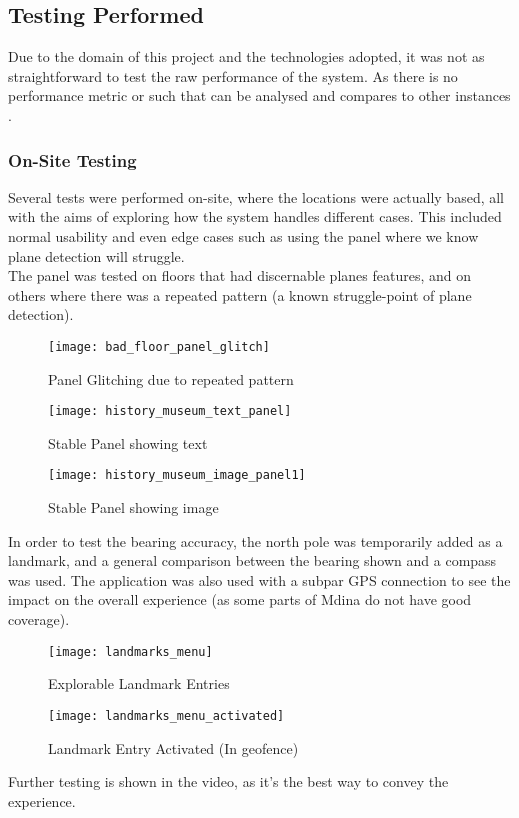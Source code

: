 \subsection{Testing Performed}
Due to the domain of this project and the technologies adopted, it was not as straightforward to 
test the raw performance of the system. As there is no performance metric or such that can be 
analysed and compares to other instances \cite{Samini2017}. 
\subsubsection{On-Site Testing}
Several tests were performed on-site, where the locations were actually based, all with the aims of exploring how the system handles different cases. 
This included normal usability and even edge cases such as using the panel where we know plane detection will struggle.
\\
The panel was tested on floors that had discernable planes features, and on others where there was a repeated pattern (a known struggle-point of plane detection).\\
\begin{figure}[!htb]
        \texttt{[image: bad\_floor\_panel\_glitch]}
            \caption{Panel Glitching due to repeated pattern}
            \label{fig:bad_panel}
    \endminipage\hfill
        \texttt{[image: history\_museum\_text\_panel]}
        \caption{Stable Panel showing text}
        \label{fig:panel_text}
    \endminipage\hfill
        \texttt{[image: history\_museum\_image\_panel1]}
        \caption{Stable Panel showing image}
        \label{fig:panel_img}
    \endminipage
    \end{figure}

\noindent
In order to test the bearing accuracy, the north pole was temporarily added as a landmark, and a general comparison between the bearing shown and a compass was used.
The application was also used with a subpar GPS connection to see the impact on the overall experience (as some parts of Mdina do not have good coverage).

\begin{figure}[!htb]
        \texttt{[image: landmarks\_menu]}
            \caption{Explorable Landmark Entries}
            \label{fig:explor_lands}
    \endminipage\hfill
        \texttt{[image: landmarks\_menu\_activated]}
        \caption{Landmark Entry Activated (In geofence)}
        \label{fig:active_land}
    \endminipage
    \end{figure}
\noindent
Further testing is shown in the video, as it's the best way to convey the experience.
